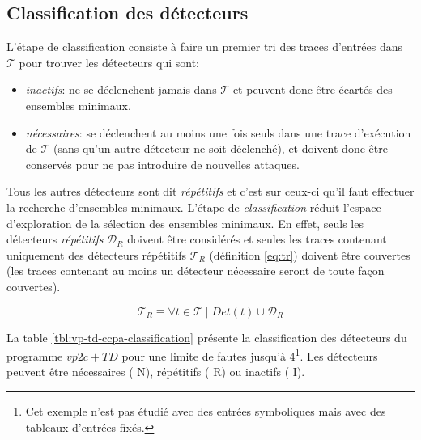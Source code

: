         \subsection{Classification des détecteurs}    
        \label{sec:ch6:classification}

            L'étape de classification consiste à faire un premier tri des traces d'entrées dans $\mathcal{T}$ pour trouver les détecteurs qui sont:
            \begin{itemize}
                \item \textit{inactifs}: ne se déclenchent jamais dans $\mathcal{T}$ et peuvent donc être écartés des ensembles minimaux.
                \item \textit{nécessaires}: se déclenchent au moins une fois seuls dans une trace d'exécution de $\mathcal{T}$ (sans qu'un autre détecteur ne soit déclenché), et doivent donc être conservés pour ne pas introduire de nouvelles attaques.
            \end{itemize}
            
            Tous les autres détecteurs sont dit \textit{répétitifs} et c'est sur ceux-ci qu'il faut effectuer la recherche d'ensembles minimaux.
            L'étape de \textit{classification} réduit l'espace d'exploration de la sélection des ensembles minimaux.
            En effet, seuls les détecteurs \textit{répétitifs} $\mathcal{D}_R$ doivent être considérés et seules les traces contenant uniquement des détecteurs répétitifs $\mathcal{T}_R$ (définition \ref{eq:tr}) doivent être couvertes (les traces contenant au moins un détecteur nécessaire seront de toute façon couvertes). 

            \begin{defi}
                \label{eq:tr}
                \begin{equation*}
                    \mathcal{T}_{R} \equiv \forall t \in \mathcal{T} \mid Det(t) \cup \mathcal{D}_R
                \end{equation*}  
            \end{defi}
            
            La table \ref{tbl:vp-td-ccpa-classification} présente la classification des détecteurs du programme $vp2c+TD$ pour une limite de fautes jusqu'à 4\footnote{Cet exemple n'est pas étudié avec des entrées symboliques mais avec des tableaux d'entrées fixés.}. Les détecteurs peuvent être nécessaires ({\color{green!50} N}), répétitifs ({\color{orange!80} R}) ou inactifs ({\color{red!80} I}).
            
